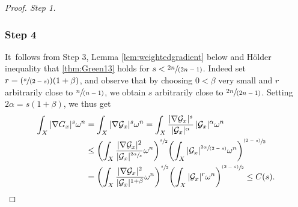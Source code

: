 \documentclass[10pt]{amsart}
\newcommand{\Pspfrac}[2]{(\sfrac{#1}{(#2)})}
\newcommand{\psfrac}[2]{\sfrac{(#1)}{#2}}
\newcommand{\spfrac}[2]{\sfrac{#1}{(#2)}}
\theoremstyle{definition}
\begin{document}
\begin{proof}[Proof. Step 1]
\subsubsection*{Step 4}
It~follows from Step 3, Lemma \ref{lem:weightedgradient} below and Hölder inequality
that \eqref{thm:Green13} holds for $s<\spfrac{2n}{2n-1}$.
Indeed set $r=\Pspfrac{s}{2-s}(1+\beta)$, and observe that
by choosing $0<\beta$ very small and $r$ arbitrarily close to $\spfrac{n}{n-1}$,
we obtain $s$ arbitrarily close to $\spfrac{2n}{2n-1}$.
Setting $2\alpha=s(1+\beta)$, we thus get
\begin{align*}
\int_X |\nabla {G}_x|^s {\omega^n}&=
\int_X |\nabla {\mathcal G}_x|^s {\omega^n}
= \int_X \frac{|\nabla {\mathcal G}_x|^s}{|{\mathcal G}_x|^{\alpha}}\, |{\mathcal G}_x|^{\alpha} {\omega^n} \\
&\leq  \left( \int_X \frac{|\nabla {\mathcal G}_x|^2}{{|{\mathcal G}_x}|^{\sfrac{2\alpha}{s}}} {\omega^n} \right)^{\sfrac{s}{2}}
\!\left( \int_X |{\mathcal G}_x|^{\spfrac{2\alpha}{2-s}} {\omega^n} \right)^{\psfrac{2-s}{2}} \\
&= \left( \int_X \frac{|\nabla {\mathcal G}_x|^2}{{|{\mathcal G}_x}|^{1+\beta}} {\omega^n} \right)^{\sfrac{s}{2}}
\!\left( \int_X |{\mathcal G}_x|^{r} {\omega^n} \right)^{\psfrac{2-s}{2}} \leq C(s).\qedhere
\end{align*}
\end{proof}
\end{document}
